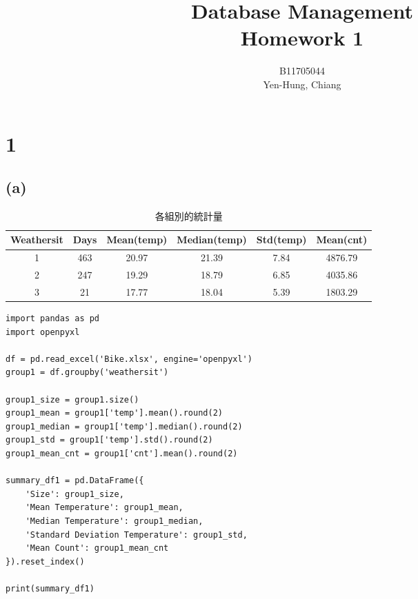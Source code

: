 \documentclass{article}
\title{Database Management\\Homework 1}
\author{B11705044 \\ Yen-Hung, Chiang}
\date{}
\begin{document}
\maketitle

\section*{1}
\subsection*{(a)}
\begin{table}[h!]
\centering
\begin{tabular}{|c|c|c|c|c|c|}
\hline
Weathersit & Days & Mean(temp) & Median(temp) & Std(temp) & Mean(cnt) \\ \hline
1 & 463 & 20.97 & 21.39 & 7.84 & 4876.79 \\ \hline
2 & 247 & 19.29 & 18.79 & 6.85 & 4035.86 \\ \hline
3 & 21 & 17.77 & 18.04 & 5.39 & 1803.29 \\ \hline
\end{tabular}
\caption{各組別的統計量}
\label{tab:example}
\end{table}
\begin{lstlisting}[caption={(a)小題的 Python Code}]
import pandas as pd
import openpyxl

df = pd.read_excel('Bike.xlsx', engine='openpyxl')
group1 = df.groupby('weathersit')

group1_size = group1.size()
group1_mean = group1['temp'].mean().round(2)
group1_median = group1['temp'].median().round(2)
group1_std = group1['temp'].std().round(2)
group1_mean_cnt = group1['cnt'].mean().round(2)

summary_df1 = pd.DataFrame({
    'Size': group1_size,
    'Mean Temperature': group1_mean,
    'Median Temperature': group1_median,
    'Standard Deviation Temperature': group1_std,
    'Mean Count': group1_mean_cnt
}).reset_index()

print(summary_df1)
\end{lstlisting}
\end{document}
